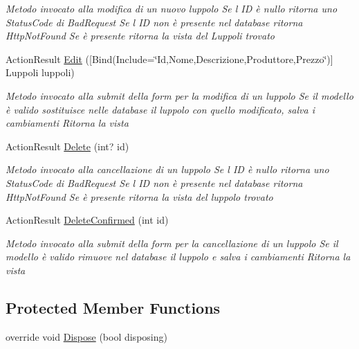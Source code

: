 \begin{DoxyCompactItemize}
\begin{DoxyCompactList}\small\item\em Metodo invocato alla modifica di un nuovo luppolo Se l\textquotesingle{} ID è nullo ritorna uno Status\+Code di Bad\+Request Se l\textquotesingle{} ID non è presente nel database ritorna Http\+Not\+Found Se è presente ritorna la vista del Luppoli trovato \end{DoxyCompactList}\item 
Action\+Result \mbox{\hyperlink{class_brew_day2_1_1_controllers_1_1_luppoli_controller_a0e5fc104793196dd13e3b38120047f4c}{Edit}} (\mbox{[}Bind(Include=\char`\"{}Id,Nome,Descrizione,Produttore,Prezzo\char`\"{})\mbox{]} Luppoli luppoli)
\begin{DoxyCompactList}\small\item\em Metodo invocato alla submit della form per la modifica di un luppolo Se il modello è valido sostituisce nelle database il luppolo con quello modificato, salva i cambiamenti Ritorna la vista \end{DoxyCompactList}\item 
Action\+Result \mbox{\hyperlink{class_brew_day2_1_1_controllers_1_1_luppoli_controller_ad7588a964b5bddcd107d96ffd9edb141}{Delete}} (int? id)
\begin{DoxyCompactList}\small\item\em Metodo invocato alla cancellazione di un luppolo Se l\textquotesingle{} ID è nullo ritorna uno Status\+Code di Bad\+Request Se l\textquotesingle{} ID non è presente nel database ritorna Http\+Not\+Found Se è presente ritorna la vista del luppolo trovato \end{DoxyCompactList}\item 
Action\+Result \mbox{\hyperlink{class_brew_day2_1_1_controllers_1_1_luppoli_controller_ae44c16148ec11a6c09de346eb22242bf}{Delete\+Confirmed}} (int id)
\begin{DoxyCompactList}\small\item\em Metodo invocato alla submit della form per la cancellazione di un luppolo Se il modello è valido rimuove nel database il luppolo e salva i cambiamenti Ritorna la vista \end{DoxyCompactList}\end{DoxyCompactItemize}
\subsection*{Protected Member Functions}
\begin{DoxyCompactItemize}
\item 
override void \mbox{\hyperlink{class_brew_day2_1_1_controllers_1_1_luppoli_controller_a43473eb90a2214b37ccc3364982dc1a6}{Dispose}} (bool disposing)
\end{DoxyCompactItemize}


